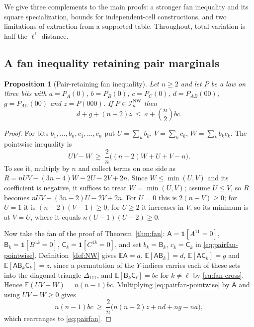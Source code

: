 \documentclass[11pt]{article}
\theoremstyle{plain}
\newtheorem{proposition}[theorem]{Proposition}
\theoremstyle{definition}
\newcommand{\INW}{\mathcal I^{\mathrm{NW}}}
\newcommand{\E}{\mathbb E}
\newcommand{\one}{\mathbf 1}
\begin{document}
We give three complements to the main proofs: a stronger fan inequality and its square specialization, bounds for independent-cell constructions, and two limitations of extraction from a supported table. Throughout, total variation is half the $\ell^1$ distance.

\subsection{A fan inequality retaining pair marginals}

\begin{proposition}[Pair-retaining fan inequality]\label{prop:pairfan}
Let $n\ge2$ and let $P$ be a law on three bits with $a=P_A(0)$, $b=P_B(0)$, $c=P_C(0)$, $d=P_{AB}(00)$, $g=P_{AC}(00)$ and $z=P(000)$. If $P\in\INW_n$ then
\begin{equation}\label{eq:pairfan}
d+g+(n-2)z\ \le\ a+\binom n2bc .
\end{equation}
\end{proposition}

\begin{proof}
For bits $b_1,\dots,b_n,c_1,\dots,c_n$ put $U=\sum_kb_k$, $V=\sum_kc_k$, $W=\sum_kb_kc_k$. The pointwise inequality is
\begin{equation}\label{eq:pairfan-pointwise}
UV-W\ \ge\ \frac2n\bigl((n-2)W+U+V-n\bigr).
\end{equation}
To see it, multiply by $n$ and collect terms on one side as $R=nUV-(3n-4)W-2U-2V+2n$. Since $W\le\min(U,V)$ and its coefficient is negative, it suffices to treat $W=\min(U,V)$; assume $U\le V$, so $R$ becomes $nUV-(3n-2)U-2V+2n$. For $U=0$ this is $2(n-V)\ge0$; for $U=1$ it is $(n-2)(V-1)\ge0$; for $U\ge2$ it increases in $V$, so its minimum is at $V=U$, where it equals $n(U-1)(U-2)\ge0$.

Now take the fan of the proof of Theorem~\ref{thm:fan}: $\mathsf A=\one[A^{11}=0]$, $\mathsf B_k=\one[B^{1k}=0]$, $\mathsf C_k=\one[C^{1k}=0]$, and set $b_k=\mathsf B_k$, $c_k=\mathsf C_k$ in \eqref{eq:pairfan-pointwise}. Definition~\ref{def:NW} gives $\E\mathsf A=a$, $\E[\mathsf A\mathsf B_k]=d$, $\E[\mathsf A\mathsf C_k]=g$ and $\E[\mathsf A\mathsf B_k\mathsf C_k]=z$, since a permutation of the $Y$-indices carries each of these sets into the diagonal triangle $\Delta_{111}$, and $\E[\mathsf B_k\mathsf C_\ell]=bc$ for $k\ne\ell$ by \eqref{eq:fan-cross}. Hence $\E(UV-W)=n(n-1)bc$. Multiplying \eqref{eq:pairfan-pointwise} by $\mathsf A$ and using $UV-W\ge0$ gives
\[
n(n-1)bc\ \ge\ \frac2n\bigl(n(n-2)z+nd+ng-na\bigr),
\]
which rearranges to \eqref{eq:pairfan}.
\end{proof}
\end{document}
